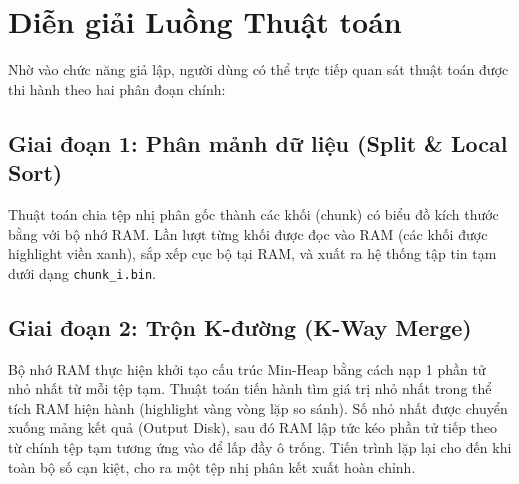 \documentclass[a4paper,12pt]{article}
\begin{document}
\section{Diễn giải Luồng Thuật toán}
Nhờ vào chức năng giả lập, người dùng có thể trực tiếp quan sát thuật toán được thi hành theo hai phân đoạn chính:

\subsection{Giai đoạn 1: Phân mảnh dữ liệu (Split \& Local Sort)}
Thuật toán chia tệp nhị phân gốc thành các khối (chunk) có biểu đồ kích thước bằng với bộ nhớ RAM. Lần lượt từng khối được đọc vào RAM (các khối được highlight viền xanh), sắp xếp cục bộ tại RAM, và xuất ra hệ thống tập tin tạm dưới dạng \texttt{chunk\_i.bin}. 

\subsection{Giai đoạn 2: Trộn K-đường (K-Way Merge)}
Bộ nhớ RAM thực hiện khởi tạo cấu trúc Min-Heap bằng cách nạp 1 phần tử nhỏ nhất từ mỗi tệp tạm. Thuật toán tiến hành tìm giá trị nhỏ nhất trong thể tích RAM hiện hành (highlight vàng vòng lặp so sánh). Số nhỏ nhất được chuyển xuống mảng kết quả (Output Disk), sau đó RAM lập tức kéo phần tử tiếp theo từ chính tệp tạm tương ứng vào để lấp đầy ô trống. Tiến trình lặp lại cho đến khi toàn bộ số cạn kiệt, cho ra một tệp nhị phân kết xuất hoàn chỉnh.
\end{document}
